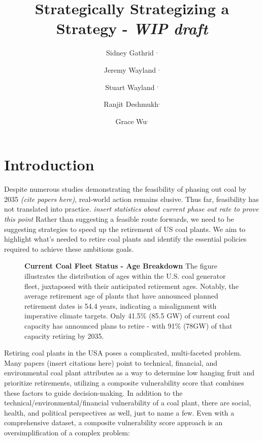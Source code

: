 \documentclass{article}
\title{Strategically Strategizing a Strategy - \textit{WIP draft}}
\author{%
    Sidney Gathrid%
    \thanksAAffil{University of California, Santa Barbara}$^{,}$\thanksANote{\{rdeshmukh, sgathrid, gracecwu\}@ucsb.edu}%
    \and%
    Jeremy Wayland%
    \thanksAAffil{Technische Universität München}$^{,}$\thanksANote{jeremy.wayland@tum.de}%
    \and%
    Stuart Wayland%
    \thanksAAffil{University of California, Santa Cruz}$^{,}$\thanksANote{swayland@ucsc.edu}%
    \and %
    Ranjit Deshmukh\footnotemarkAAffil[  1]$^{,}$\footnotemarkANote[1]%
    \and%
    Grace Wu\footnotemarkAAffil[  1]$^{,}$\footnotemarkANote[1]%
}
\date{}
\begin{document}
\maketitle

\section{Introduction}

Despite numerous studies demonstrating the feasibility of phasing out coal by 2035 \textit{(cite papers here)}, real-world action remains elusive. Thus far, feasibility has not translated into practice. \textit{insert statistics about current phase out rate to prove this point} Rather than suggesting a feasible route forwards, we need to be suggesting strategies to speed up the retirement of US coal plants. We aim to highlight what's needed to retire coal plants and identify the essential policies required to achieve these ambitious goals.


\begin{figure}[h]
    
    
    \label{fig:1}
    \caption{\textbf{Current Coal Fleet Status - Age Breakdown} The figure illustrates the distribution of ages within the U.S. coal generator fleet, juxtaposed with their anticipated retirement ages. Notably, the average retirement age of plants that have announced planned retirement dates is 54.4 years, indicating a misalignment with imperative climate targets. Only 41.5\% (85.5 GW) of current coal capacity has announced plans to retire - with 91\% (78GW) of that capacity retiring by 2035.}
\end{figure}


Retiring coal plants in the USA poses a complicated, multi-faceted problem. Many papers (insert citations here) point to technical, financial, and environmental coal plant attributes as a way to determine low hanging fruit and prioritize retirements, utilizing a composite vulnerability score that combines these factors to guide decision-making. In addition to the technical/environmental/financial vulnerability of a coal plant, there are social, health, and political perspectives as well, just to name a few. Even with a comprehensive dataset, a composite vulnerability score approach is an oversimplification of a complex problem:
\end{document}
